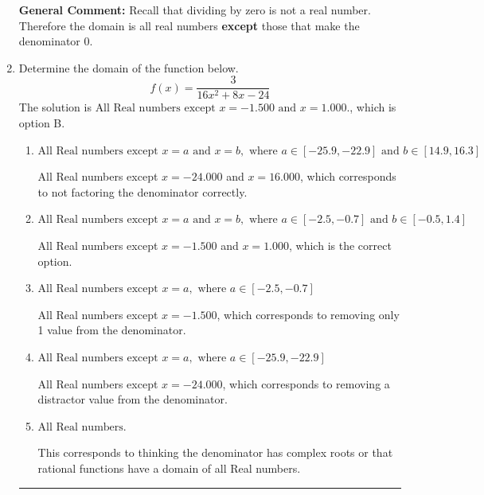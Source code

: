 \documentclass{extbook}[14pt]
\newcommand{\litem}[1]{\item #1

\rule{\textwidth}{0.4pt}}
\begin{document}
\begin{enumerate}
{\textbf{General Comment:} Recall that dividing by zero is not a real number. Therefore the domain is all real numbers \textbf{except} those that make the denominator 0.
}
\litem{
Determine the domain of the function below.
\[ f(x) = \frac{3}{16x^{2} +8 x -24} \]The solution is \( \text{All Real numbers except } x = -1.500 \text{ and } x = 1.000. \), which is option B.\begin{enumerate}[label=\Alph*.]
\item \( \text{All Real numbers except } x = a \text{ and } x = b, \text{ where } a \in [-25.9, -22.9] \text{ and } b \in [14.9, 16.3] \)

All Real numbers except $x = -24.000$ and $x = 16.000$, which corresponds to not factoring the denominator correctly.
\item \( \text{All Real numbers except } x = a \text{ and } x = b, \text{ where } a \in [-2.5, -0.7] \text{ and } b \in [-0.5, 1.4] \)

All Real numbers except $x = -1.500$ and $x = 1.000$, which is the correct option.
\item \( \text{All Real numbers except } x = a, \text{ where } a \in [-2.5, -0.7] \)

All Real numbers except $x = -1.500$, which corresponds to removing only 1 value from the denominator.
\item \( \text{All Real numbers except } x = a, \text{ where } a \in [-25.9, -22.9] \)

All Real numbers except $x = -24.000$, which corresponds to removing a distractor value from the denominator.
\item \( \text{All Real numbers.} \)

This corresponds to thinking the denominator has complex roots or that rational functions have a domain of all Real numbers.
\end{enumerate}

}
\end{enumerate}
\end{document}
